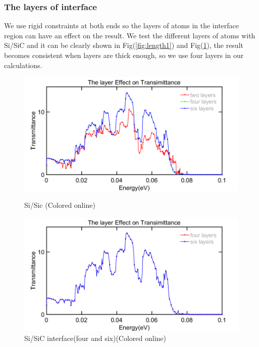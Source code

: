 \subsubsection*{The layers of interface}
We use rigid constraints at both ends so the layers of atoms in the interface region can have an effect on the result. We test the different layers of atoms with Si/SiC and it can be clearly shown in Fig(\ref{fig:length1}) and Fig(\ref{fig:length2}), the result becomes consistent when layers are thick enough, so we use four layers in our calculations.
\begin{figure}
\begin{minipage}[t]{0.5\linewidth}
\centering
\includegraphics[width=\textwidth]{length1.png}
\caption{Si/Sic (Colored online)}
\label{fig:length1}
\end{minipage}%
\begin{minipage}[t]{0.5\linewidth}
\centering
\includegraphics[width=\textwidth]{length2.png}
\caption{Si/SiC interface(four and six)(Colored online)}
\label{fig:length2}
\end{minipage}
\end{figure}
